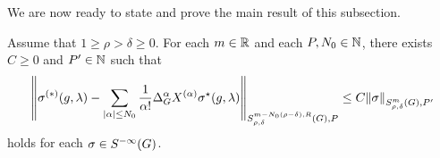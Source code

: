 We are now ready to state and prove the main result of this subsection.

\begin{proposition}
\label{proposition:adjoint_formula}
    Assume that $1 \geq \rho > \delta \geq 0$.
    For each $m \in \mathbb{R}$ and each $P, N_0 \in \mathbb{N}$,
    there exists $C \geq 0$ and $P' \in \mathbb{N}$ such that
    \begin{align*}
        \SymbolSemiNorm {m - N_0 (\rho - \delta), R} {\rho, \delta} P {%
        \sigma^{(*)}(g, \lambda)
        - \sum_{\abs \alpha \leq N_0} \frac 1 {\alpha!} \DifferenceOperatorOrder \alpha \TaylorLeftDifferentialOperator \alpha \adj \sigma(g, \lambda)
        } \leq
        C
        \SymbolSemiNorm m {\rho, \delta} {P'} \sigma
    \end{align*}
    holds for each $\sigma \in {S^{-\infty} (G)}$.
\end{proposition}

